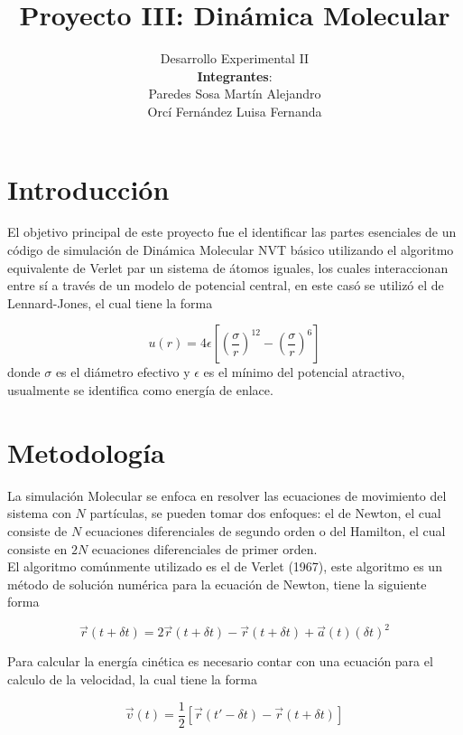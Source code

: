 \documentclass[12pt,letterpaper]{article}
\author{Desarrollo Experimental II
{\small }\\
\textbf{Integrantes}:\\  Paredes Sosa Martín Alejandro \\ Orcí Fernández Luisa Fernanda \vspace*{.2in}}
\title{
{\Huge Proyecto III: Dinámica Molecular}\\
\vspace*{0.2in}}
\begin{document}
	\maketitle

\section*{Introducción}
El objetivo principal de este proyecto fue el identificar las partes esenciales de un código de simulación de Dinámica Molecular NVT básico utilizando el algoritmo equivalente de Verlet par un sistema de átomos iguales, los cuales interaccionan entre sí a través de un modelo de potencial central, en este casó se utilizó el de Lennard-Jones, el cual tiene la forma

\begin{equation}
u(r) = 4\epsilon [(\frac{\sigma}{r})^{12} - (\frac{\sigma}{r})^6 ]
\end{equation}
donde $\sigma$ es el diámetro efectivo y $\epsilon$ es el mínimo del potencial atractivo, usualmente se identifica como energía de enlace. \\

\section*{Metodología}
La simulación Molecular se enfoca en resolver las ecuaciones de movimiento del sistema con $N$ partículas, se pueden tomar dos enfoques: el de Newton, el cual consiste de $N$ ecuaciones diferenciales de segundo orden o del Hamilton, el cual consiste en $2N$ ecuaciones diferenciales de primer orden. \\
El algoritmo comúnmente utilizado es el de Verlet (1967), este algoritmo es un método de solución numérica para la ecuación de Newton, tiene la siguiente forma

\begin{equation}
\overrightarrow{r}(t + \delta t) = 2 \overrightarrow{r}(t + \delta t) - \overrightarrow{r}(t + \delta t) + \overrightarrow{a}(t)(\delta t)^2
\end{equation}

Para calcular la energía cinética es necesario contar con una ecuación para el calculo de la velocidad, la cual tiene la forma

\begin{equation}
\overrightarrow{v}(t) = \frac{1}{2} [\overrightarrow{r}(t' -\delta t) - \overrightarrow{r}(t + \delta t) ]
\end{equation}
\end{document}
